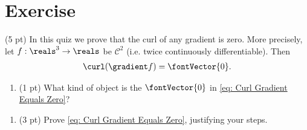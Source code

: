 %
%
%
%
\section{Exercise}

(5 pt) In this quiz we prove that the curl of any gradient is zero. More precisely, let $f: \reals^{3} \rightarrow \reals$ be $\mathscr{C}^{2}$ (i.e. twice continuously differentiable). Then
\begin{align}
\curl(\gradient f)
=
\fontVector{0}.%
\label{eq: Curl Gradient Equals Zero}
\end{align}
\begin{enumerate}[label=(\alph*)]
\item\label{itm: Math212 F2016 Quiz32a} (1 pt) What kind of object is the $\fontVector{0}$ in \eqref{eq: Curl Gradient Equals Zero}?
\end{enumerate}




\begin{enumerate}[resume,label=(\alph*)]
\item\label{itm: Math212 F2016 Quiz32b} (3 pt) Prove \eqref{eq: Curl Gradient Equals Zero}, justifying your steps. 
\end{enumerate}

